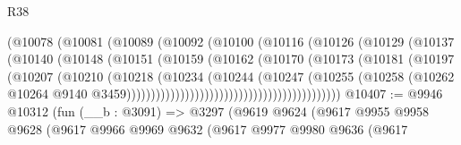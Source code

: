\begin{lexlean}{R38}
\begin{coremodule}
                                      (@10078
                                        (@10081
                                          (@10089
                                            (@10092
                                              (@10100
                                                (@10116
                                                  (@10126
                                                    (@10129
                                                      (@10137
                                                        (@10140
                                                          (@10148
                                                            (@10151
                                                              (@10159
                                                                (@10162
                                                                  (@10170
                                                                    (@10173
                                                                      (@10181
                                                                        (@10197
                                                                          (@10207
                                                                            (@10210
                                                                              (@10218
                                                                                (@10234
                                                                                  (@10244
                                                                                    (@10247
                                                                                      (@10255
                                                                                        (@10258
                                                                                          (@10262
                                                                                            @10264
                                                                                            @9140
                                                                                            @3459))))))))))))))))))))))))))))))))))))))))))))
@10407 := @9946
    @10312
    (fun (__b : @3091) =>
    @3297
      (@9619
        @9624
        (@9617
          @9955
          @9958
          @9628
          (@9617
            @9966
            @9969
            @9632
            (@9617
              @9977
              @9980
              @9636
              (@9617

\end{coremodule}
\end{lexlean}
